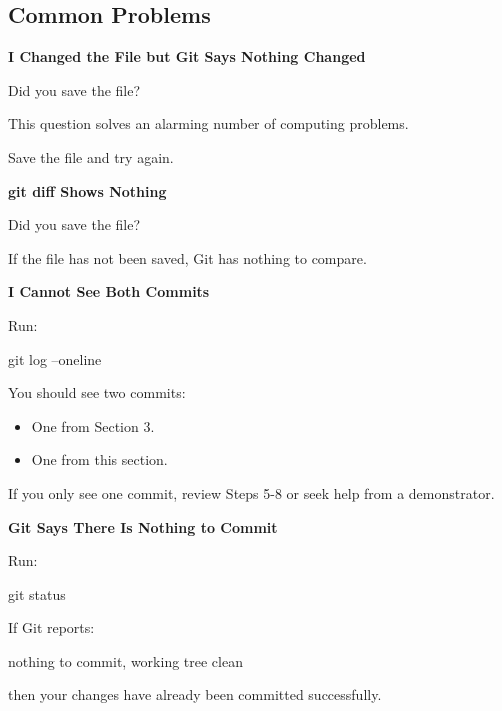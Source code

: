 \documentclass{csc2059practical}
\begin{document}
\subsection{Common Problems}
\begin{commonerror}
\textbf{I Changed the File but Git Says Nothing Changed}\par
\medskip

Did you save the file?


This question solves an alarming number of computing problems.


Save the file and try again.


\end{commonerror}
\begin{commonerror}
\textbf{git diff Shows Nothing}\par
\medskip

Did you save the file?


If the file has not been saved, Git has nothing to compare.


\end{commonerror}
\begin{commonerror}
\textbf{I Cannot See Both Commits}\par
\medskip

Run:


\end{commonerror}
\begin{terminalplain}
git log --oneline
\end{terminalplain}
You should see two commits:

\begin{itemize}
  \item One from Section 3.
  \item One from this section.
\end{itemize}
If you only see one commit, review Steps 5-8 or seek help from a demonstrator.

\begin{commonerror}
\textbf{Git Says There Is Nothing to Commit}\par
\medskip

Run:


\end{commonerror}
\begin{terminalplain}
git status
\end{terminalplain}
If Git reports:

\begin{terminalplain}
nothing to commit, working tree clean
\end{terminalplain}
then your changes have already been committed successfully.
\end{document}
